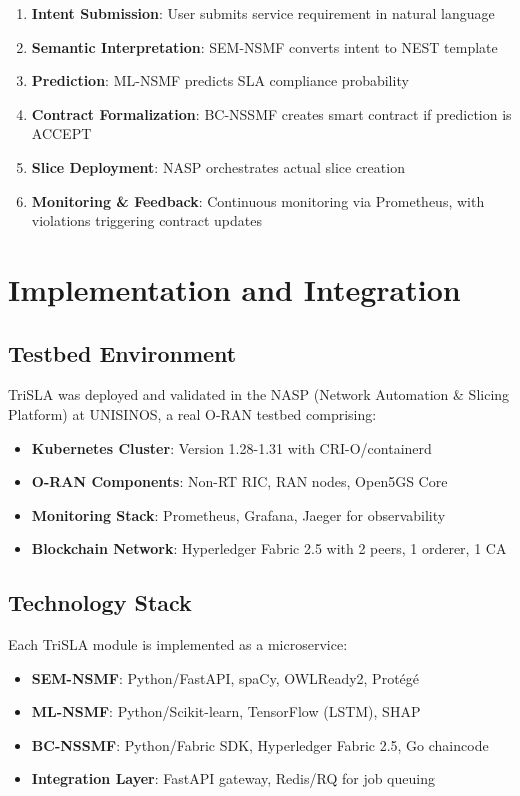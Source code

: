 \documentclass[review]{elsarticle}
\begin{document}
\begin{enumerate}
    \item \textbf{Intent Submission}: User submits service requirement in natural language
    \item \textbf{Semantic Interpretation}: SEM-NSMF converts intent to NEST template
    \item \textbf{Prediction}: ML-NSMF predicts SLA compliance probability
    \item \textbf{Contract Formalization}: BC-NSSMF creates smart contract if prediction is ACCEPT
    \item \textbf{Slice Deployment}: NASP orchestrates actual slice creation
    \item \textbf{Monitoring \& Feedback}: Continuous monitoring via Prometheus, with violations triggering contract updates
\end{enumerate}

\section{Implementation and Integration}

\subsection{Testbed Environment}

TriSLA was deployed and validated in the NASP (Network Automation \& Slicing Platform) at UNISINOS, a real O-RAN testbed comprising:
\begin{itemize}
    \item \textbf{Kubernetes Cluster}: Version 1.28-1.31 with CRI-O/containerd
    \item \textbf{O-RAN Components}: Non-RT RIC, RAN nodes, Open5GS Core
    \item \textbf{Monitoring Stack}: Prometheus, Grafana, Jaeger for observability
    \item \textbf{Blockchain Network}: Hyperledger Fabric 2.5 with 2 peers, 1 orderer, 1 CA
\end{itemize}

\subsection{Technology Stack}

Each TriSLA module is implemented as a microservice:

\begin{itemize}
    \item \textbf{SEM-NSMF}: Python/FastAPI, spaCy, OWLReady2, Protégé
    \item \textbf{ML-NSMF}: Python/Scikit-learn, TensorFlow (LSTM), SHAP
    \item \textbf{BC-NSSMF}: Python/Fabric SDK, Hyperledger Fabric 2.5, Go chaincode
    \item \textbf{Integration Layer}: FastAPI gateway, Redis/RQ for job queuing
\end{itemize}
\end{document}

